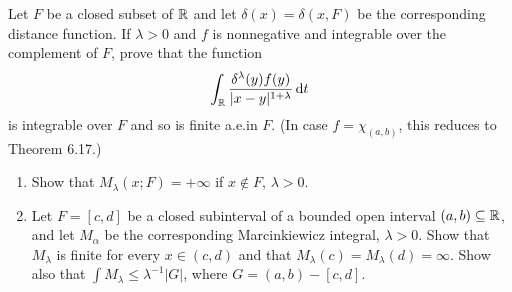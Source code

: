 \begin{problem}
  Let \(F\) be a closed subset of \(\mathbb{R}\) and let
  \(\delta(x)=\delta(x,F)\) be the corresponding distance function. If
  \(\lambda>0\) and \(f\) is nonnegative and integrable over the complement
  of \(F\), prove that the function
  \[
    \int_{\mathbb{R}}\frac{\delta^\lambda(y)f(y)}{|x-y|^{1+\lambda}}\mathop{}\!\mathrm{d} t
  \]
  is integrable over \(F\) and so is finite a.e.\@ in \(F\). (In case
  \(f=\chi_{(a,b)}\), this reduces to Theorem 6.17.)
\end{problem}
\begin{solution}
\end{solution}

\begin{problem}
  \hfill
  \begin{enumerate}[label=(\alph*)]
  \item Show that \(M_\lambda(x;F)=+\infty\) if \(x\notin F\),
    \(\lambda>0\).
  \item Let \(F=[c,d]\) be a closed subinterval of a bounded open interval
    \((a,b)\subseteq\mathbb{R}\), and let \(M_\alpha\) be the corresponding
    Marcinkiewicz integral, \(\lambda>0\). Show that \(M_\lambda\) is
    finite for every \(x\in(c,d)\) and that
    \(M_\lambda(c)=M_\lambda(d)=\infty\). Show also that
    \(\int M_\lambda\leq\lambda^{-1}|G|\), where \(G=(a,b)-[c,d]\).
  \end{enumerate}
\end{problem}
\begin{solution}
\end{solution}

